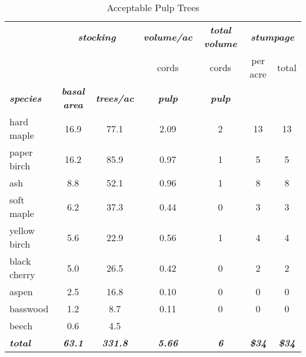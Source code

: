 \documentclass[landscape]{article}
\begin{document}
\begin{table}[H]

\caption{\label{tab:unnamed-chunk-56}Acceptable Pulp Trees}
\fontsize{10}{12}\selectfont
\begin{tabular}[t]{lcccccc}
\toprule
\multicolumn{1}{c}{\em{\textbf{ }}} & \multicolumn{2}{c}{\em{\textbf{stocking}}} & \multicolumn{1}{c}{\em{\textbf{volume/ac }}} & \multicolumn{1}{c}{\em{\textbf{total volume}}} & \multicolumn{2}{c}{\em{\textbf{stumpage}}} \\
\cmidrule(l{3pt}r{3pt}){2-3} \cmidrule(l{3pt}r{3pt}){4-4} \cmidrule(l{3pt}r{3pt}){5-5} \cmidrule(l{3pt}r{3pt}){6-7}
\multicolumn{3}{c}{ } & \multicolumn{1}{c}{cords} & \multicolumn{1}{c}{cords} & \multicolumn{1}{c}{per acre} & \multicolumn{1}{c}{total} \\
\cmidrule(l{3pt}r{3pt}){4-4} \cmidrule(l{3pt}r{3pt}){5-5} \cmidrule(l{3pt}r{3pt}){6-6} \cmidrule(l{3pt}r{3pt}){7-7}
\rowcolor[HTML]{DCDCDC}  \em{\textbf{species}} & \em{\textbf{basal area}} & \em{\textbf{trees/ac}} & \em{\textbf{pulp}} & \em{\textbf{pulp}} & \em{\textbf{ }} & \em{\textbf{ }}\\
\midrule
\rowcolor{gray!6}  hard maple & 16.9 & 77.1 & 2.09 & 2 & 13 & 13\\
 
paper birch & 16.2 & 85.9 & 0.97 & 1 & 5 & 5\\
 
\rowcolor{gray!6}  ash & 8.8 & 52.1 & 0.96 & 1 & 8 & 8\\
 
soft maple & 6.2 & 37.3 & 0.44 & 0 & 3 & 3\\
 
\rowcolor{gray!6}  yellow birch & 5.6 & 22.9 & 0.56 & 1 & 4 & 4\\
 
black cherry & 5.0 & 26.5 & 0.42 & 0 & 2 & 2\\
 
\rowcolor{gray!6}  aspen & 2.5 & 16.8 & 0.10 & 0 & 0 & 0\\
 
basswood & 1.2 & 8.7 & 0.11 & 0 & 0 & 0\\
 
\rowcolor{gray!6}  beech & 0.6 & 4.5 &  &  &  & \\
 
\rowcolor[HTML]{DCDCDC}  \em{\textbf{total}} & \em{\textbf{63.1}} & \em{\textbf{331.8}} & \em{\textbf{5.66}} & \em{\textbf{6}} & \em{\textbf{\$34}} & \em{\textbf{\$34}}\\
\bottomrule
\end{tabular}
\end{table}
\end{document}
